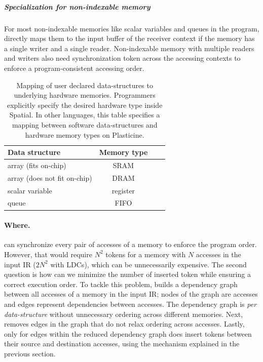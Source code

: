 \subparagraph{Specialization for non-indexable memory}
For most non-indexable memories like scalar variables and queues in the program, \name directly maps
them to the input buffer of the receiver context if the memory has a single writer and a single
reader.
Non-indexable memory with multiple readers and writers also need synchronization token across
the accessing contexts to enforce a program-consistent accessing order.

\begin{table}
  \centering
\begin{tabular}{lccc}
  \toprule
 Data structure & Memory type \\ \midrule
  array (fits on-chip) & SRAM \\
  array (does not fit on-chip) & DRAM \\
  scalar variable & register \\
  queue & FIFO \\
 \bottomrule
\end{tabular}
\caption[Mapping of data-structures to hardware memories]{
  Mapping of user declared data-structures to underlying hardware memories. 
  Programmers explicitly specify the desired hardware type inside Spatial. 
  In other languages, this table specifies a mapping between software data-structures 
  and hardware memory types on Plasticine.
}
\label{tab:memtype}
\end{table}

\paragraph{Where.}
\name can synchronize every pair of accesses of a memory to enforce the program order. However, that
would require $N^2$ tokens for a memory with $N$ accesses in the input IR ($2N^2$ with LDCs), which can be
unnecessarily expensive.
The second question is how can we minimize the number of inserted token while ensuring a correct
execution order.
To tackle this problem, \name builds a dependency graph between all accesses of a memory in the input IR; 
nodes of the graph are accesses and edges represent dependencies between accesses.
The dependency graph is \emph{per data-structure} without unnecessary ordering across different memories.
Next, \name removes edges in the graph that do not relax ordering across accesses.
Lastly, only for edges within the reduced dependency graph does \name insert tokens
between their source and destination accesses, using the mechanism explained in the previous section.

